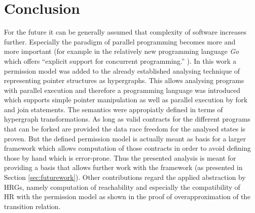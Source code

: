\section{Conclusion}
	For the future it can be generally assumed that complexity of software
	increases further. Especially the paradigm of parallel programming becomes
	more and more important (for example in the relatively new programming
	language \emph{Go} which offers \enquote{explicit support for concurrent
	programming.} \cite{golang}). In this work a permission model was added to
	the already established analysing technique of representing pointer
	structures as hypergraphs. This allows analysing programs with parallel
	execution and therefore a programming language was introduced which supports
	simple pointer manipulation as well as parallel execution by fork and join
	statements. The semantics were appropiatly defined in terms of hypergraph
	transformations. As long as valid contracts for the different programs that
	can be forked are provided the data race freedom for the analysed states is
	proven. But the defined permission model is actually meant as basis for a
	larger framework which allows computation of those contracts in order to
	avoid defining those by hand which is error-prone.  Thus the presented
	analysis is meant for providing a basis that allows further work with the
	framework (as presented in Section \ref{sec:futurework}). Other
	contributions regard the applied abstraction by \aclp{HRG}, namely
	computation of reachability and especially the compatibility of \acl{HR}
	with the permission model as shown in the proof of overapproximation of the
	transition relation.
